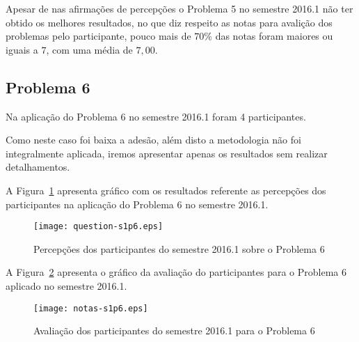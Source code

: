 Apesar de nas afirmações de percepções o Problema 5 no semestre
2016.1 não ter obtido os melhores resultados, no que diz respeito
as notas para avalição dos problemas pelo participante,
pouco mais de $70\%$ das notas foram maiores ou iguais a $7$, com
uma média de $7,00$.

\subsection{Problema 6}
Na aplicação do Problema 6 no semestre 2016.1 foram 4 participantes.

Como neste caso foi baixa a adesão, além disto a metodologia
não foi integralmente aplicada, iremos apresentar apenas
os resultados sem realizar detalhamentos.

A Figura~\ref{percep-s1p6} apresenta gráfico com os resultados referente
as percepções dos participantes na aplicação do
Problema 6 no semestre 2016.1.

\begin{figure}[!htb]
\centering
\texttt{[image: question-s1p6.eps]}
\caption{Percepções dos participantes do semestre 2016.1 sobre o Problema 6}
\label{percep-s1p6}
\end{figure}

A Figura~\ref{aval-s1p6} apresenta o gráfico da
avaliação do participantes para o Problema 6 aplicado no semestre 2016.1.

\begin{figure}[!htb]
\centering
\texttt{[image: notas-s1p6.eps]}
\caption{Avaliação dos participantes do semestre 2016.1 para o Problema 6}
\label{aval-s1p6}
\end{figure}

